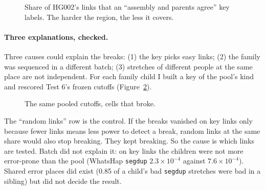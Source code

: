 \documentclass[11pt]{article}
\newcommand{\grp}[1]{\texttt{#1}}
\newcommand{\failbar}[5]{%
  \node[anchor=east,font=\scriptsize,align=right] at (-0.03,#1) {#2};
  \fill[gray!20] (0,#1-0.13) rectangle (1,#1+0.13);
  \fill[#5] (0,#1-0.13) rectangle ({max(#3,0.008)},#1+0.13);
  \node[anchor=west,font=\scriptsize\bfseries,text=#5] at (1.03,#1) {#4};}
\begin{document}
\begin{figure}[h]
\centering
{}
\caption{Share of HG002's links that an \enquote{assembly and parents agree} key
labels. The harder the region, the less it covers.}
\label{fig:labshare}
\end{figure}

\paragraph{Three explanations, checked.} Three causes could explain the
breaks: (1) the key picks easy links; (2) the family was sequenced in a
different batch; (3) stretches of different people at the same place are not
independent. For each family child I built a key of the pool's kind and
rescored Test 6's frozen cutoffs (Figure~\ref{fig:keybars}).

\begin{figure}[h]
\centering
{}
\caption{The same pooled cutoffs, cells that broke.}
\label{fig:keybars}
\end{figure}

The \enquote{random links} row is the control. If the breaks vanished on key
links only because fewer links means less power to detect a break, random
links at the same share would also stop breaking. They kept breaking. So the
cause is which links are tested. Batch did not explain it: on key links
the children were not more error-prone than the pool (WhatsHap \grp{segdup}
$2.3\times10^{-4}$ against $7.6\times10^{-4}$). Shared error places did exist (0.85
of a child's bad \grp{segdup} stretches were bad in a sibling) but did not
decide the result.
\end{document}
